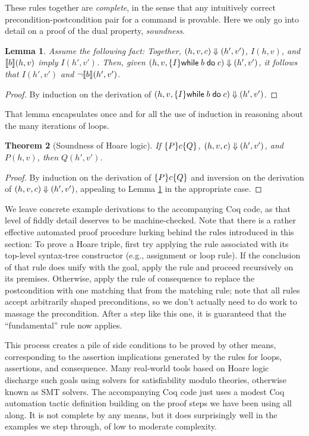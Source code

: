 \documentclass{amsbook}
\newtheorem{theorem}{Theorem}[chapter]
\newtheorem{lemma}[theorem]{Lemma}
\theoremstyle{definition}
\theoremstyle{remark}
\numberwithin{section}{chapter}
\numberwithin{equation}{chapter}
\begin{document}
These rules together are \emph{complete}, in the sense that any intuitively correct precondition-postcondition pair for a command is provable.
Here we only go into detail on a proof of the dual property, \emph{soundness}.

\begin{lemma}\label{hoare_while}
  Assume the following fact: Together, $(h, v, c) \Downarrow (h', v')$, $I(h, v)$, and ${\left \llbracket b \right \rrbracket}(h, v)$ imply $I(h', v')$.
  Then, given $(h, v, \{I\} \mathsf{while} \; b \; \mathsf{do} \; c) \Downarrow (h', v')$, it follows that $I(h', v')$ and $\neg {\left \llbracket b \right \rrbracket}(h', v')$.
\end{lemma}
\begin{proof}
  By induction on the derivation of $(h, v, \{I\} \mathsf{while} \; b \; \mathsf{do} \; c) \Downarrow (h', v')$.
\end{proof}

That lemma encapsulates once and for all the use of induction in reasoning about the many iterations of loops.

\begin{theorem}[Soundness of Hoare logic]
  If $\{P\} c \{Q\}$, $(h, v, c) \Downarrow (h', v')$, and $P(h, v)$, then $Q(h', v')$.
\end{theorem}
\begin{proof}
  By induction on the derivation of $\{P\} c \{Q\}$ and inversion on the derivation of $(h, v, c) \Downarrow (h', v')$, appealing to Lemma \ref{hoare_while} in the appropriate case.
\end{proof}

We leave concrete example derivations to the accompanying Coq code, as that level of fiddly detail deserves to be machine-checked.
Note that there is a rather effective automated proof procedure lurking behind the rules introduced in this section:
To prove a Hoare triple, first try applying the rule associated with its top-level syntax-tree constructor (e.g., assignment or loop rule).
If the conclusion of that rule does unify with the goal, apply the rule and proceed recursively on its premises.
Otherwise, apply the rule of consequence to replace the postcondition with one matching that from the matching rule; note that all rules accept arbitrarily shaped preconditions, so we don't actually need to do work to massage the precondition.
After a step like this one, it is guaranteed that the ``fundamental'' rule now applies.

This process creates a pile of side conditions to be proved by other means, corresponding to the assertion implications generated by the rules for loops, assertions, and consequence.
Many real-world tools based on Hoare logic discharge such goals using solvers for satisfiability modulo theories, otherwise known as SMT solvers.
The accompanying Coq code just uses a modest Coq automation tactic definition building on the proof steps we have been using all along.
It is not complete by any means, but it does surprisingly well in the examples we step through, of low to moderate complexity.
\end{document}

